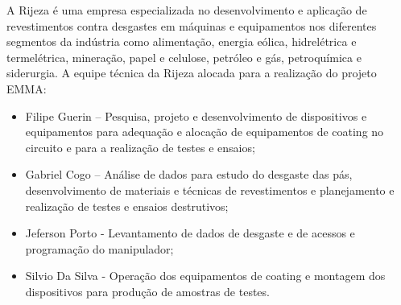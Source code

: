 A Rijeza é uma empresa especializada no desenvolvimento e aplicação de
revestimentos contra desgastes em máquinas e equipamentos nos diferentes
segmentos da indústria como alimentação, energia eólica, hidrelétrica e
termelétrica, mineração, papel e celulose, petróleo e gás, petroquímica e siderurgia.
A equipe técnica da Rijeza alocada para a realização do projeto EMMA:

\begin{itemize}
  \item Filipe Guerin – Pesquisa, projeto e desenvolvimento de dispositivos e
  equipamentos para adequação e alocação de equipamentos de coating no circuito
  e para a realização de testes e ensaios;
  \item Gabriel Cogo – Análise de dados para estudo do desgaste das pás,
  desenvolvimento de materiais e técnicas de revestimentos e planejamento e
  realização de testes e ensaios destrutivos;
  \item Jeferson Porto - Levantamento de dados de desgaste e de acessos e
  programação do manipulador;
  \item Silvio Da Silva - Operação dos equipamentos de coating e montagem dos
  dispositivos para produção de amostras de testes.
\end{itemize}


















    
    
  
